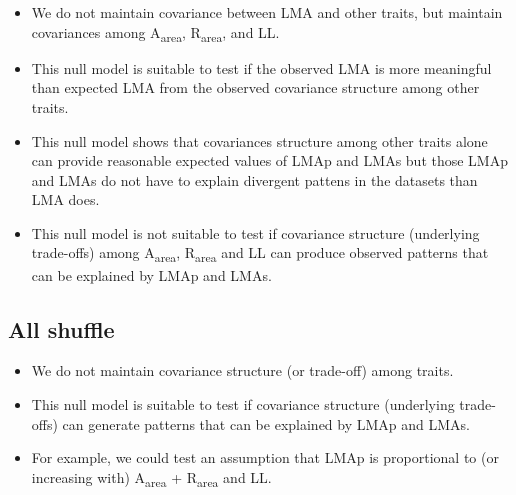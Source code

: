 \documentclass[12pt,]{article}
\providecommand{\tightlist}{%
  \setlength{\itemsep}{0pt}\setlength{\parskip}{0pt}}
\begin{document}
\begin{itemize}
\tightlist
\item
  We do not maintain covariance between LMA and other traits, but
  maintain covariances among A\textsubscript{area},
  R\textsubscript{area}, and LL.
\item
  This null model is suitable to test if the observed LMA is more
  meaningful than expected LMA from the observed covariance structure
  among other traits.
\item
  This null model shows that covariances structure among other traits
  alone can provide reasonable expected values of LMAp and LMAs but
  those LMAp and LMAs do not have to explain divergent pattens in the
  datasets than LMA does.
\item
  This null model is not suitable to test if covariance structure
  (underlying trade-offs) among A\textsubscript{area},
  R\textsubscript{area} and LL can produce observed patterns that can be
  explained by LMAp and LMAs.
\end{itemize}

\subsection{All shuffle}\label{all-shuffle}

\begin{itemize}
\tightlist
\item
  We do not maintain covariance structure (or trade-off) among traits.
\item
  This null model is suitable to test if covariance structure
  (underlying trade-offs) can generate patterns that can be explained by
  LMAp and LMAs.
\item
  For example, we could test an assumption that LMAp is proportional to
  (or increasing with) A\textsubscript{area} + R\textsubscript{area} and
  LL.
\end{itemize}
\end{document}
